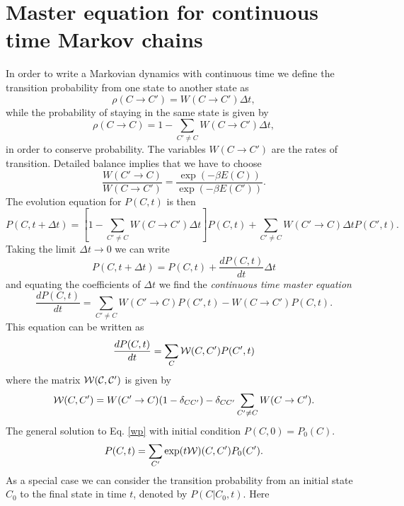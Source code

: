 \documentclass[11pt]{report}
\begin{document}
\section{Master equation for continuous time Markov chains}
In order to write a Markovian dynamics with continuous time we define
the transition probability from one state to another state as
\begin{equation}
\rho(C\to C') = W(C\to C')\Delta t,
\end{equation}
while the probability of staying in the same state is given by
\begin{equation}
\rho(C\to C) = 1-\sum_{C'\neq C}W(C\to C')\Delta t,
\end{equation}
in order to conserve probability. The variables $W(C\to C')$ are the rates of transition.
Detailed balance implies that we have to choose
\begin{equation}\boxed{
\frac{W(C'\to C)}{W(C \to C')} = \frac{\exp(-\beta E(C))}{\exp(-\beta E(C'))}.}
\end{equation} 
The evolution equation for $P(C,t)$ is then 
\begin{equation}
P(C,t+\Delta t)=  \left[ 1 - \sum_{C'\neq C}W(C\to C')\Delta t\right]P(C,t) + \sum_{C'\neq C} W(C'\to C) \Delta t P(C',t).
\end{equation}
Taking the limit $\Delta t\to 0$ we can write
\begin{equation}
P(C,t+\Delta t) = P(C,t) +\frac{dP(C,t)}{dt}\Delta t 
\end{equation}
and equating the coefficients of $\Delta t$ we find the {\em continuous time master equation}
\begin{equation}
\boxed{
\frac{dP(C,t)}{dt} =  \sum_{C'\neq C} W(C'\to C)  P(C',t) - W(C\to C')P(C,t).}
\end{equation}
This equation can be written as
\begin{equation}
\frac{dP(C,t)}{dt} =  \sum_{C} {\cal W}(C, C')  P(C',t) \label{wp}
\end{equation}
where the matrix $\cal{W}(C, C')$ is given by
\begin{equation}
{\cal W}(C, C') = W(C'\to C)(1-\delta_{CC'}) - \delta_{CC'}\sum_{C'\neq C} W(C\to C').
\end{equation}
The general solution to Eq. \eqref{wp} with initial condition $P(C,0)=P_0(C)$.
\begin{equation}
P(C,t) = \sum_{C'} \exp(t {\cal W})(C,C')P_0(C').
\end{equation}
As a special case we can consider the transition probability from an initial state $C_0$ to the final state in time $t$, denoted by $P(C|C_0,t)$. Here
\end{document}
